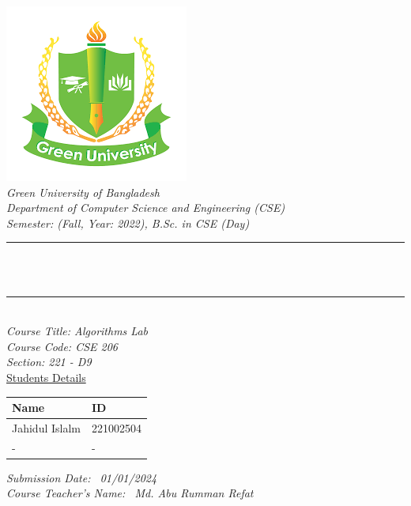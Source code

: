 \begin{titlepage}
\center 
\newcommand{\HRule}{\rule{\linewidth}{0.1mm}}
\includegraphics[scale=0.6]{Figures/GUB.png}\\[1cm] 
\center 
\textsl{\Large Green University of Bangladesh }\\[0.5cm] 
\textsl{\large Department of Computer Science and Engineering (CSE)}\\
\textsl{\large Semester: (Fall, Year: 2022), B.Sc. in CSE (Day)}\\[0.5cm] 
\makeatletter
\HRule \\[0.4cm]
{ \huge \bfseries \@title}\\[0.2cm] 
\HRule \\[1.0cm]

\textsl{\large Course Title: Algorithms Lab }\\
\textsl{\large Course Code: CSE 206}\\ 
\textsl{\large Section: 221 - D9}\\[0.5cm] 

{\large \underline{Students Details}}\\[0.2cm]

\begin{table}[htb]
\centering
\begin{tabular}{ |P{7.0cm}|P{3.5cm}|}
\hline
\textbf{Name} & \textbf{ID}\\
\hline
Jahidul Islalm  & 221002504 \\
\hline
- & - \\
\hline
\end{tabular}
\end{table}
\vspace{0.5cm}


\textsl{\large Submission Date: \ 01/01/2024 }\\ 
\textsl{\large Course Teacher’s Name: \ Md. Abu Rumman Refat  }\\[0.9cm] 





\end{titlepage}
